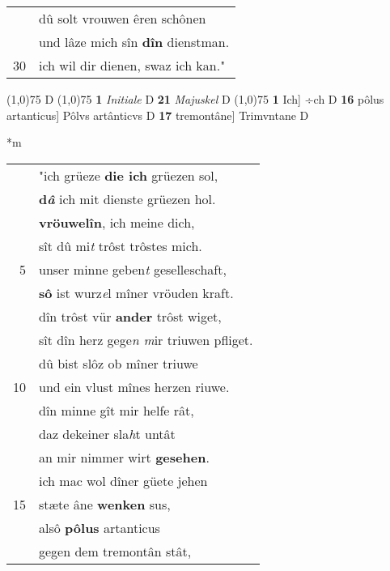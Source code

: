 \documentclass[8pt,a4paper,notitlepage]{article}
\begin{document}
\begin{table}[ht]
\begin{minipage}[t]{0.5\linewidth}
\begin{tabular}{rl}
 & dû solt vrouwen êren schônen\\ 
 & und lâze mich sîn \textbf{dîn} dienstman.\\ 
30 & ich wil dir dienen, swaz ich kan."\\ 
\end{tabular}
\scriptsize
\line(1,0){75} \newline
D \newline
\line(1,0){75} \newline
\textbf{1} \textit{Initiale} D  \textbf{21} \textit{Majuskel} D  \newline
\line(1,0){75} \newline
\textbf{1} Ich] ÷ch D \textbf{16} pôlus artanticus] Pôlvs artânticvs D \textbf{17} tremontâne] Trimvntane D \newline
\end{minipage}
\hspace{0.5cm}
\begin{minipage}[t]{0.5\linewidth}
\small
\begin{center}*m
\end{center}
\begin{tabular}{rl}
 & "ich grüeze \textbf{die ich} grüezen sol,\\ 
 & \textbf{d\textit{â}} ich mit dienste grüezen hol.\\ 
 & \textbf{vröuwelîn}, ich meine dich,\\ 
 & sît dû mi\textit{t} trôst trôstes mich.\\ 
5 & unser minne geben\textit{t} geselleschaft,\\ 
 & \textbf{sô} ist wurz\textit{e}l mîner vröuden kraft.\\ 
 & dîn trôst vür \textbf{ander} trôst wiget,\\ 
 & sît dîn herz gege\textit{n m}ir triuwen pfliget.\\ 
 & dû bist slôz ob mîner triuwe\\ 
10 & und ein vlust mînes herzen riuwe.\\ 
 & dîn minne gît mir helfe rât,\\ 
 & daz dekeiner sla\textit{h}t untât\\ 
 & an mir nimmer wirt \textbf{gesehen}.\\ 
 & ich mac wol dîner güete jehen\\ 
15 & stæte âne \textbf{wenken} sus,\\ 
 & alsô \textbf{pôlus} artanticus\\ 
 & gegen dem tremontân stât,\\ 

\end{tabular}
\end{minipage}
\end{table}
\end{document}

